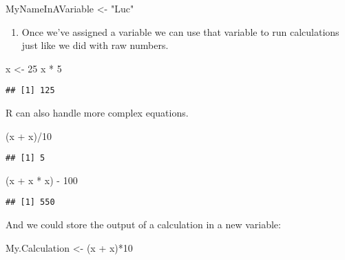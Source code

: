 \documentclass[
]{article}
\newenvironment{Shaded}{\begin{snugshade}}{\end{snugshade}}
\newcommand{\DecValTok}[1]{\textcolor[rgb]{0.00,0.00,0.81}{#1}}
\newcommand{\NormalTok}[1]{#1}
\newcommand{\OtherTok}[1]{\textcolor[rgb]{0.56,0.35,0.01}{#1}}
\newcommand{\SpecialCharTok}[1]{\textcolor[rgb]{0.00,0.00,0.00}{#1}}
\newcommand{\StringTok}[1]{\textcolor[rgb]{0.31,0.60,0.02}{#1}}
\providecommand{\tightlist}{%
  \setlength{\itemsep}{0pt}\setlength{\parskip}{0pt}}
\begin{document}
\begin{Shaded}
\begin{Highlighting}[]
\NormalTok{MyNameInAVariable }\OtherTok{\textless{}{-}} \StringTok{"Luc"}
\end{Highlighting}
\end{Shaded}

\begin{enumerate}
\def\labelenumi{(\arabic{enumi})}
\setcounter{enumi}{9}
\tightlist
\item
  Once we've assigned a variable we can use that variable to run
  calculations just like we did with raw numbers.
\end{enumerate}

\begin{Shaded}
\begin{Highlighting}[]
\NormalTok{x }\OtherTok{\textless{}{-}} \DecValTok{25}
\NormalTok{x }\SpecialCharTok{*} \DecValTok{5}
\end{Highlighting}
\end{Shaded}

\begin{verbatim}
## [1] 125
\end{verbatim}

R can also handle more complex equations.

\begin{Shaded}
\begin{Highlighting}[]
\NormalTok{(x }\SpecialCharTok{+}\NormalTok{ x)}\SpecialCharTok{/}\DecValTok{10}
\end{Highlighting}
\end{Shaded}

\begin{verbatim}
## [1] 5
\end{verbatim}

\begin{Shaded}
\begin{Highlighting}[]
\NormalTok{(x }\SpecialCharTok{+}\NormalTok{ x }\SpecialCharTok{*}\NormalTok{ x) }\SpecialCharTok{{-}} \DecValTok{100}
\end{Highlighting}
\end{Shaded}

\begin{verbatim}
## [1] 550
\end{verbatim}

And we could store the output of a calculation in a new variable:

\begin{Shaded}
\begin{Highlighting}[]
\NormalTok{My.Calculation }\OtherTok{\textless{}{-}}\NormalTok{ (x }\SpecialCharTok{+}\NormalTok{ x)}\SpecialCharTok{*}\DecValTok{10}
\end{Highlighting}
\end{Shaded}
\end{document}
